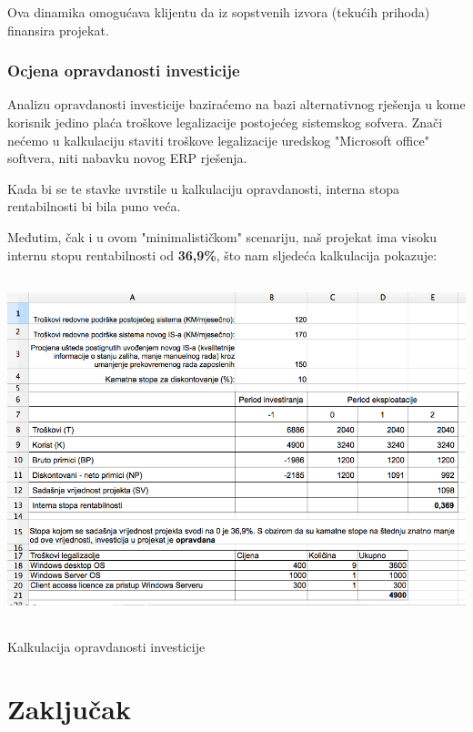 \documentclass[times, utf8, seminar]{fit}
\begin{document}
Ova dinamika omogućava klijentu da iz sopstvenih izvora (tekućih prihoda) finansira projekat.

\subsection{Ocjena opravdanosti investicije}

Analizu opravdanosti investicije baziraćemo na bazi alternativnog rješenja u kome korisnik jedino plaća troškove legalizacije postojećeg sistemskog sofvera.
Znači nećemo u kalkulaciju staviti troškove legalizacije uredskog "Microsoft office" softvera, niti nabavku novog ERP rješenja.

Kada bi se te stavke uvrstile u kalkulaciju opravdanosti, interna stopa rentabilnosti bi bila puno veća.

Međutim, čak i u ovom "minimalističkom" scenariju, naš projekat ima visoku internu stopu rentabilnosti od \textbf{36,9\%}, što nam sljedeća kalkulacija pokazuje:

\begin{table}[!h]
\centering
\includegraphics[height=10cm]{img/kalk_opravdanost.png}
\caption{Kalkulacija opravdanosti investicije}
\end{table}

\chapter{Zaključak}



\end{document}
